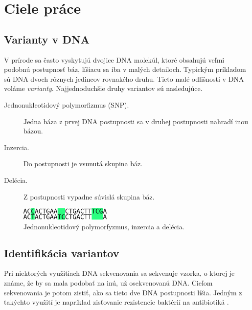 \chapter{Ciele práce}

\label{kap:ciele}


\section{Varianty v DNA}

V prírode sa často vyskytujú dvojice DNA molekúl, ktoré obsahujú veľmi podobnú postupnosť báz, líšiacu sa iba v malých detailoch. Typickým príkladom sú DNA dvoch rôznych jedincov rovnakého druhu. Tieto malé odlišnosti v DNA voláme \emph{varianty}. Najjednoduchšie druhy variantov sú nasledujúce.

\begin{description}
\item [Jednonukleotidový polymorfizmus (SNP\footnotemark).] Jedna báza z prvej DNA postupnosti sa v druhej postupnosti nahradí inou bázou.

\item [Inzercia.] Do postupnosti je vsunutá skupina báz.

\item [Delécia.] Z postupnosti vypadne súvislá skupina báz.

\end{description}

\begin{figure}[t]
\centerline{\includegraphics[width=0.4\textwidth]{images/varianty}}
\caption[Varianty v DNA]{Jednonukleotidový polymorfyzmus, inzercia a delécia.}
\label{obr:varianty}
\end{figure}

\section{Identifikácia variantov}

Pri niektorých využitiach DNA sekvenovania sa sekvenuje vzorka, o ktorej je známe, že by
sa mala podobať na inú, už osekvenovanú DNA. 
Cieľom sekvenovania je potom zistiť, ako sa tieto dve DNA postupnosti líšia. Jedným z takýchto využití 
je napríklad zisťovanie rezistencie baktérií na antibiotiká \cite{Bradley2015}.

